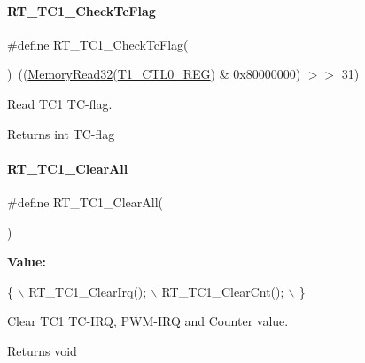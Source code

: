 \paragraph{\texorpdfstring{R\+T\+\_\+\+T\+C1\+\_\+\+Check\+Tc\+Flag}{RT\_TC1\_CheckTcFlag}}
{\footnotesize\ttfamily \#define R\+T\+\_\+\+T\+C1\+\_\+\+Check\+Tc\+Flag(\begin{DoxyParamCaption}{ }\end{DoxyParamCaption})~((\mbox{\hyperlink{a00020_a2d484dc15bdf30ee11ab3b05f31f0e16}{Memory\+Read32}}(\mbox{\hyperlink{a00020_adadaa0ab1ebbd7ba9b70dfd24c3ed44da38632250c2e72df96fcaa3f8bd8ecc5e}{T1\+\_\+\+C\+T\+L0\+\_\+\+R\+EG}}) \& 0x80000000) $>$$>$ 31)}



Read T\+C1 T\+C-\/flag. 

\begin{DoxyReturn}{Returns}
int T\+C-\/flag 
\end{DoxyReturn}
\mbox{\label{a00044_a2a7757de241add69f5fffc4e1dfa431a}} 
\paragraph{\texorpdfstring{R\+T\+\_\+\+T\+C1\+\_\+\+Clear\+All}{RT\_TC1\_ClearAll}}
{\footnotesize\ttfamily \#define R\+T\+\_\+\+T\+C1\+\_\+\+Clear\+All(\begin{DoxyParamCaption}{ }\end{DoxyParamCaption})}

{\bfseries Value\+:}
\begin{DoxyCode}
\{                   \(\backslash\)
        RT\_TC1\_ClearIrq(); \(\backslash\)
        RT\_TC1\_ClearCnt(); \(\backslash\)
    \}
\end{DoxyCode}


Clear T\+C1 T\+C-\/\+I\+RQ, P\+W\+M-\/\+I\+RQ and Counter value. 

\begin{DoxyReturn}{Returns}
void 
\end{DoxyReturn}
\mbox{\label{a00044_abcd4f7c1a53b5d0a31f45076725a1ed6}} 
